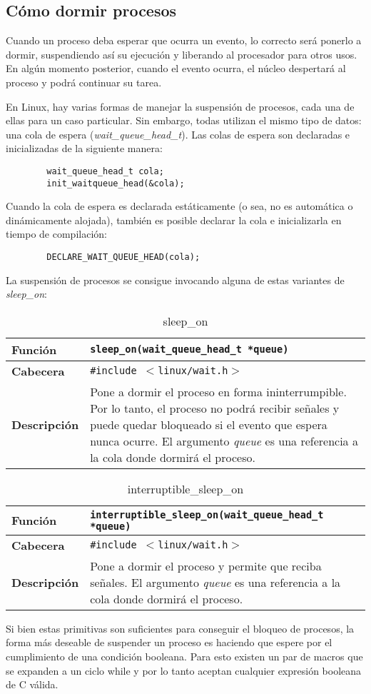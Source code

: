 \documentclass[12pt,a4paper,spanish]{article}
\newenvironment{funcdesc}[1]
	{	
		\begin{table}[!htp]
		\caption{ {#1} }
		\begin{small}
		\begin{tabular}{ | l | p{10cm} | } \hline
	}
	{
		\end{tabular}
		\end{small}
		\end{table}
	}
\newcommand{\funcion}[1] {\textbf {Función} &  \texttt{{#1}} \\ \hline}
\newcommand{\cabecera}[1] {\textbf {Cabecera} &  \texttt{\#include $<${#1}$>$} \\ \hline}
\newcommand{\descrip}[1] {\textbf {Descripción} &  {#1} \\ \hline}
\begin{document}
\subsection{Cómo dormir procesos}
Cuando un proceso deba esperar que ocurra un evento, lo correcto será ponerlo a dormir, suspendiendo así su ejecución y liberando al procesador para otros usos. En algún momento posterior, cuando el evento ocurra, el núcleo despertará al proceso y podrá continuar su tarea.

En Linux, hay varias formas de manejar la suspensión de procesos, cada una de ellas para un caso particular. Sin embargo, todas utilizan el mismo tipo de datos: una cola de espera (\textit{wait\_queue\_head\_t}). Las colas de espera son declaradas e inicializadas de la siguiente manera:

\begin{verbatim}
        wait_queue_head_t cola;
        init_waitqueue_head(&cola);
\end{verbatim} 

Cuando la cola de espera es declarada estáticamente (o sea, no es automática o dinámicamente alojada), también es posible declarar la cola e inicializarla en tiempo de compilación:

\begin{verbatim}
        DECLARE_WAIT_QUEUE_HEAD(cola);
\end{verbatim} 

La suspensión de procesos se consigue invocando alguna de estas variantes de \textit{sleep\_on}:

\begin{funcdesc}{sleep\_on}
\funcion{sleep\_on(wait\_queue\_head\_t *queue)}
\cabecera{linux/wait.h}
\descrip{Pone a dormir el proceso
en forma ininterrumpible. Por lo tanto, el proceso no podrá recibir señales y
puede quedar bloqueado si el evento que espera nunca ocurre. El argumento
\textit{queue} es una referencia a la cola donde dormirá el proceso.}
\end{funcdesc}

\begin{funcdesc}{interruptible\_sleep\_on}
\funcion{interruptible\_sleep\_on(wait\_queue\_head\_t *queue)}
\cabecera{linux/wait.h}
\descrip{Pone a dormir el proceso y permite que reciba señales. El argumento
\textit{queue} es una referencia a la cola donde dormirá el proceso.}
\end{funcdesc}


Si bien estas primitivas son suficientes para conseguir el bloqueo de procesos, la forma más deseable de suspender un proceso es haciendo que espere por el cumplimiento de una condición booleana. Para esto existen un par de macros que se expanden a un ciclo while y por lo tanto aceptan cualquier expresión booleana de C válida.
\end{document}
